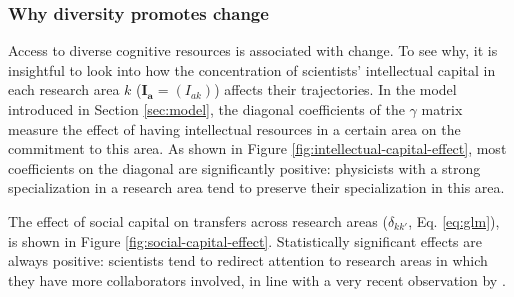 \documentclass{article}
\begin{document}
\subsubsection{Why diversity promotes change}

Access to diverse cognitive resources is associated with change. To see why, it is insightful to look into how the concentration of scientists' intellectual capital in each research area $k$ ($\bm{I_a}=(I_{ak})$) affects their trajectories. In the model introduced in Section \ref{sec:model}, the diagonal coefficients of the $\gamma$ matrix measure the effect of having intellectual resources in a certain area on the commitment to this area. As shown in Figure \ref{fig:intellectual-capital-effect}, most coefficients on the diagonal are significantly positive: physicists with a strong specialization in a research area tend to preserve their specialization in this area.

The effect of social capital on transfers across research areas ($\delta_{kk'}$, Eq. \ref{eq:glm}), is shown in Figure \ref{fig:social-capital-effect}. Statistically significant effects are always positive: scientists tend to redirect attention to research areas in which they have more collaborators involved, in line with a very recent observation by \citeauthor{Venturini2024} \citealt{Venturini2024}.
\end{document}
